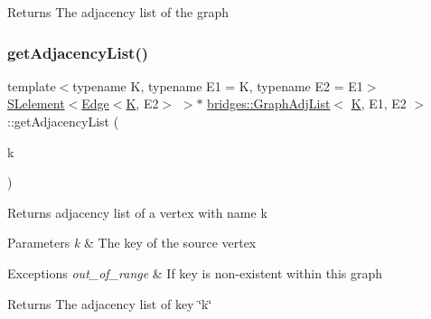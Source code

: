 \begin{DoxyReturn}{Returns}
The adjacency list of the graph 
\end{DoxyReturn}
\mbox{\label{classbridges_1_1_graph_adj_list_ab9eb791b7c242742ac832121f297acdc}} 
\subsubsection{\texorpdfstring{getAdjacencyList()}{getAdjacencyList()}\hspace{0.1cm}{\footnotesize\ttfamily [2/3]}}
{\footnotesize\ttfamily template$<$typename K, typename E1 = K, typename E2 = E1$>$ \\
\mbox{\hyperlink{classbridges_1_1_s_lelement}{S\+Lelement}}$<$\mbox{\hyperlink{classbridges_1_1_edge}{Edge}}$<$\mbox{\hyperlink{namespacebridges_acfb0a4f7877d8f63de3e6862004c50edaa5f3c6a11b03839d46af9fb43c97c188}{K}}, E2$>$ $>$$\ast$ \mbox{\hyperlink{classbridges_1_1_graph_adj_list}{bridges\+::\+Graph\+Adj\+List}}$<$ \mbox{\hyperlink{namespacebridges_acfb0a4f7877d8f63de3e6862004c50edaa5f3c6a11b03839d46af9fb43c97c188}{K}}, E1, E2 $>$\+::get\+Adjacency\+List (\begin{DoxyParamCaption}\item[{const \mbox{\hyperlink{namespacebridges_acfb0a4f7877d8f63de3e6862004c50edaa5f3c6a11b03839d46af9fb43c97c188}{K}} \&}]{k }\end{DoxyParamCaption})\hspace{0.3cm}{\ttfamily [inline]}}

Returns adjacency list of a vertex with name k


\begin{DoxyParams}{Parameters}
{\em k} & The key of the source vertex \\
\hline
\end{DoxyParams}

\begin{DoxyExceptions}{Exceptions}
{\em out\+\_\+of\+\_\+range} & If key is non-\/existent within this graph\\
\hline
\end{DoxyExceptions}
\begin{DoxyReturn}{Returns}
The adjacency list of key \char`\"{}k\char`\"{} 
\end{DoxyReturn}
\mbox{\label{classbridges_1_1_graph_adj_list_a6d5af10da7c8b5ea62969be448f59c84}} 
